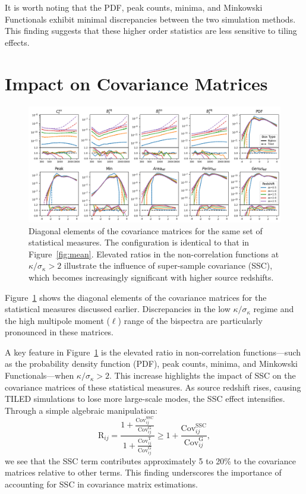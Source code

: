 It is worth noting that the PDF, peak counts, minima, and Minkowski Functionals exhibit minimal discrepancies between the two simulation methods. This finding suggests that these higher order statistics are less sensitive to tiling effects.

\section{Impact on Covariance Matrices}
\begin{figure}
    \centering
    \includegraphics[width=\textwidth]{figures/diag_final.png}
    \caption{Diagonal elements of the covariance matrices for the same set of statistical measures. The configuration is identical to that in Figure~\ref{fig:mean}. Elevated ratios in the non-correlation functions at $\kappa/\sigma_\kappa > 2$ illustrate the influence of super-sample covariance (SSC), which becomes increasingly significant with higher source redshifts.}
    \label{fig:diag}
\end{figure}
Figure~\ref{fig:diag} shows the diagonal elements of the covariance matrices for the statistical measures discussed earlier. Discrepancies in the low $\kappa/\sigma_\kappa$ regime and the high multipole moment ($\ell$) range of the bispectra are particularly pronounced in these matrices.

A key feature in Figure~\ref{fig:diag} is the elevated ratio in non-correlation functions—such as the probability density function (PDF), peak counts, minima, and Minkowski Functionals—when $\kappa/\sigma_\kappa > 2$. This increase highlights the impact of SSC on the covariance matrices of these statistical measures. As source redshift rises, causing TILED simulations to lose more large-scale modes, the SSC effect intensifies. Through a simple algebraic manipulation:
\begin{equation}
    \text{R}_{ij} = \frac{1 + \tfrac{\text{Cov}^{\text{SSC}}_{ij}}{\text{Cov}^{\text{G}}_{ij}}}
    {1 + \tfrac{\text{Cov}^{\text{T}}_{ij}}{\text{Cov}^{\text{G}}_{ij}}} \geq 1 + \frac{\text{Cov}^{\text{SSC}}_{ij}}{\text{Cov}^{\text{G}}_{ij}},
    \label{eq:cov_contribution}
\end{equation}
we see that the SSC term contributes approximately 5 to 20\% to the covariance matrices relative to other terms. This finding underscores the importance of accounting for SSC in covariance matrix estimations.

